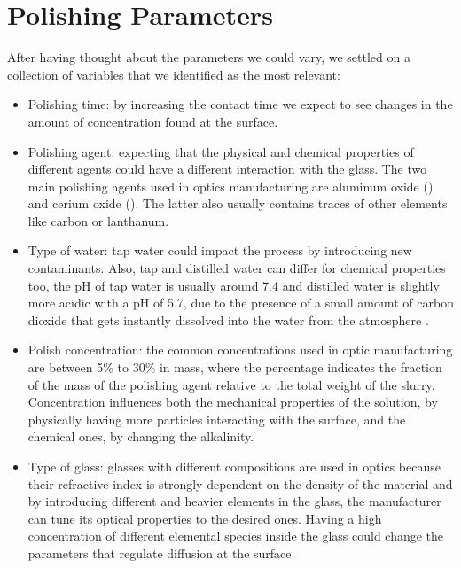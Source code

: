 \section{Polishing Parameters}
\label{sec:pol_parameter}
After having thought about the parameters we could vary, we settled on a collection of variables that we identified as the most relevant:
\begin{itemize}
    \item Polishing time: by increasing the contact time we expect to see changes in the amount of concentration found at the surface.
    \item Polishing agent: expecting that the physical and chemical properties of different agents could have a different interaction with the glass. The two main polishing agents used in optics manufacturing are aluminum oxide () and cerium oxide (). The latter also usually contains traces of other elements like carbon or lanthanum.
    \item Type of water: tap water could impact the process by introducing new contaminants. Also, tap and distilled water can differ for chemical properties too, the pH of tap water is usually around 7.4 and distilled water is slightly more acidic with a pH of 5.7, due to the presence of a small amount of carbon dioxide that gets instantly dissolved into the water from the atmosphere \cite{kulthananPHWaterVarious2013}.
    \item Polish concentration: the common concentrations used in optic manufacturing are between 5\% to 30\% in mass, where the percentage indicates the fraction of the mass of the polishing agent relative to the total weight of the slurry. Concentration influences both the mechanical properties of the solution, by physically having more particles interacting with the surface, and the chemical ones, by changing the alkalinity.
    \item Type of glass: glasses with different compositions are used in optics because their refractive index is strongly dependent on the density of the material \cite{ritlandRelationRefractiveIndex1955} and by introducing different and heavier elements in the glass, the manufacturer can tune its optical properties to the desired ones. Having a high concentration of different elemental species inside the glass could change the parameters that regulate diffusion at the surface.
\end{itemize}

